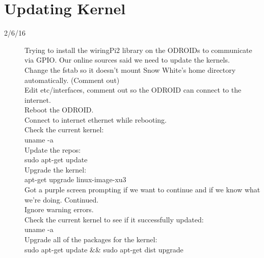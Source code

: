\section{Updating Kernel}
\begin{description}
\item [2/6/16] Trying to install the wiringPi2 library on the ODROIDs to communicate via GPIO. Our online sources said we need to update the kernels. \\

Change the fstab so it doesn't mount Snow White's home directory automatically. (Comment out) \\
Edit etc/interfaces, comment out so the ODROID can connect to the internet.\\
Reboot the ODROID.\\
Connect to internet ethernet while rebooting. \\
Check the current kernel: \\
uname -a \\
Update the repos: \\
sudo apt-get update \\
Upgrade the kernel: \\
apt-get upgrade linux-image-xu3 \\
Got a purple screen prompting if we want to continue and if we know what we're doing. Continued. \\
Ignore warning errors. \\
Check the current kernel to see if it successfully updated: \\
uname -a \\
Upgrade all of the packages for the kernel: \\
sudo apt-get update \&\& sudo apt-get dist upgrade
\end{description}